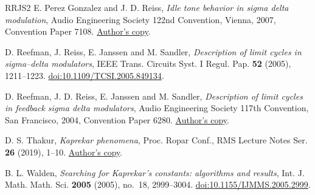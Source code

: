 \documentclass[11pt]{amsart}
\theoremstyle{definition}
\begin{document}
\begin{thebibliography}{RRJS2}
E. Perez Gonzalez and J. D. Reiss,
\emph{Idle tone behavior in sigma delta modulation},
Audio Engineering Society 122nd Convention, Vienna, 2007,
Convention Paper 7108.
\href{https://joshreiss.github.io/documents/2007/PerezReiss-AES122.pdf}{Author's copy}.

D. Reefman, J. Reiss, E. Janssen and M. Sandler,
\emph{Description of limit cycles in sigma--delta modulators},
IEEE Trans. Circuits Syst. I Regul. Pap. \textbf{52} (2005), 1211--1223.
\href{https://doi.org/10.1109/TCSI.2005.849134}{doi:10.1109/TCSI.2005.849134}.

D. Reefman, J. D. Reiss, E. Janssen and M. Sandler,
\emph{Description of limit cycles in feedback sigma delta modulators},
Audio Engineering Society 117th Convention, San Francisco, 2004,
Convention Paper 6280.
\href{https://joshreiss.github.io/documents/2004/ReefmanReiss-AES117-2004.pdf}{Author's copy}.

D. S. Thakur, \emph{Kaprekar phenomena},
Proc. Ropar Conf., RMS Lecture Notes Ser. \textbf{26} (2019), 1--10.
\href{https://people.math.rochester.edu/faculty/dthakur2/kaprekar.pdf}{Author's copy}.

B. L. Walden, \emph{Searching for Kaprekar's constants: algorithms and
results}, Int. J. Math. Math. Sci. \textbf{2005} (2005), no.~18,
2999--3004.
\href{https://doi.org/10.1155/IJMMS.2005.2999}{doi:10.1155/IJMMS.2005.2999}.
\end{thebibliography}
\end{document}
